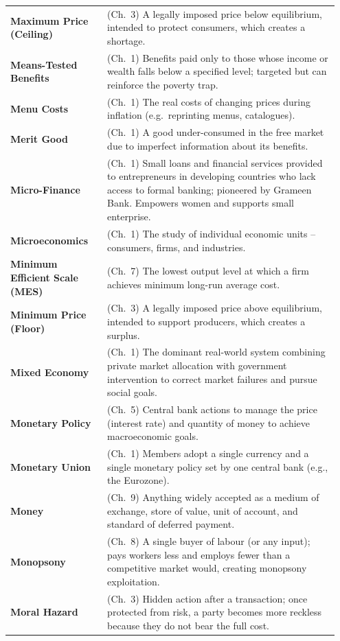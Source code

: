 \documentclass[11pt, a4paper, twoside]{book}
\begin{document}
\begin{longtable}{@{}>{\RaggedRight\arraybackslash}p{0.28\linewidth}>{\RaggedRight\arraybackslash}p{0.67\linewidth}@{}}
\textbf{Maximum Price (Ceiling)} & (Ch.~3) A legally imposed price below equilibrium, intended to protect consumers, which creates a shortage. \\
\textbf{Means-Tested Benefits} & (Ch.~1) Benefits paid only to those whose income or wealth falls below a specified level; targeted but can reinforce the poverty trap. \\
\textbf{Menu Costs} & (Ch.~1) The real costs of changing prices during inflation (e.g.\ reprinting menus, catalogues). \\
\textbf{Merit Good} & (Ch.~1) A good under-consumed in the free market due to imperfect information about its benefits. \\
\textbf{Micro-Finance} & (Ch.~1) Small loans and financial services provided to entrepreneurs in developing countries who lack access to formal banking; pioneered by Grameen Bank. Empowers women and supports small enterprise. \\
\textbf{Microeconomics} & (Ch.~1) The study of individual economic units -- consumers, firms, and industries. \\
\textbf{Minimum Efficient Scale (MES)} & (Ch.~7) The lowest output level at which a firm achieves minimum long-run average cost. \\
\textbf{Minimum Price (Floor)} & (Ch.~3) A legally imposed price above equilibrium, intended to support producers, which creates a surplus. \\
\textbf{Mixed Economy} & (Ch.~1) The dominant real-world system combining private market allocation with government intervention to correct market failures and pursue social goals. \\
\textbf{Monetary Policy} & (Ch.~5) Central bank actions to manage the price (interest rate) and quantity of money to achieve macroeconomic goals. \\
\textbf{Monetary Union} & (Ch.~1) Members adopt a single currency and a single monetary policy set by one central bank (e.g., the Eurozone). \\
\textbf{Money} & (Ch.~9) Anything widely accepted as a medium of exchange, store of value, unit of account, and standard of deferred payment. \\
\textbf{Monopsony} & (Ch.~8) A single buyer of labour (or any input); pays workers less and employs fewer than a competitive market would, creating monopsony exploitation. \\
\textbf{Moral Hazard} & (Ch.~3) Hidden action after a transaction; once protected from risk, a party becomes more reckless because they do not bear the full cost. \\

\end{longtable}
\end{document}
